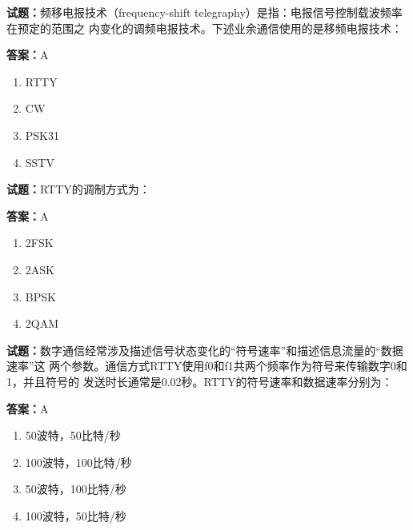 \documentclass{ctexbook}
\begin{document}




\vspace{1em}

\textbf{试题：}频移电报技术（frequency-shift telegraphy）是指：电报信号控制载波频率在预定的范围之
内变化的调频电报技术。下述业余通信使用的是移频电报技术： 

\textbf{答案：}A 

\begin{enumerate}[leftmargin=3em]
  \item RTTY 

  \item CW 

  \item PSK31 

  \item SSTV 


\end{enumerate}





\vspace{1em}

\textbf{试题：}RTTY的调制方式为： 

\textbf{答案：}A 

\begin{enumerate}[leftmargin=3em]
  \item 2FSK 

  \item 2ASK 

  \item BPSK 

  \item 2QAM 

\end{enumerate}





\vspace{1em}

\textbf{试题：}数字通信经常涉及描述信号状态变化的“符号速率”和描述信息流量的“数据速率”这
两个参数。通信方式RTTY使用f0和f1共两个频率作为符号来传输数字0和1，并且符号的
发送时长通常是0.02秒。RTTY的符号速率和数据速率分别为： 

\textbf{答案：}A 

\begin{enumerate}[leftmargin=3em]
  \item 50波特，50比特/秒 

  \item 100波特，100比特/秒 

  \item 50波特，100比特/秒 

  \item 100波特，50比特/秒 

\end{enumerate}
\end{document}
